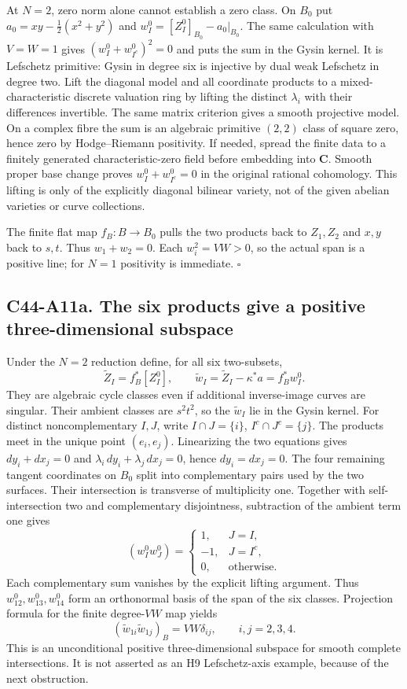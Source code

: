 \documentclass[11pt]{article}
\theoremstyle{remark}\newtheorem{remark}[theorem]{Remark}
\begin{document}
At $N=2$, zero norm alone cannot establish a zero class.
On $B_0$ put $a_0=xy-\tfrac12(x^2+y^2)$ and
$w_I^0=[Z_I^0]_{B_0}-a_0|_{B_0}$.
The same calculation with $V=W=1$ gives
$(w_I^0+w_{I^c}^0)^2=0$ and puts the sum in the Gysin kernel.
It is Lefschetz primitive: Gysin in degree six is injective
by dual weak Lefschetz in degree two.
Lift the diagonal model and all coordinate products to a
mixed-characteristic discrete valuation ring by lifting the
distinct $\lambda_i$ with their differences invertible.
The same matrix criterion gives a smooth projective model.
On a complex fibre the sum is an algebraic primitive $(2,2)$
class of square zero, hence zero by Hodge--Riemann positivity.
If needed, spread the finite data to a finitely generated
characteristic-zero field before embedding into $\mathbf C$.
Smooth proper base change proves
$w_I^0+w_{I^c}^0=0$ in the original rational cohomology.
This lifting is only of the explicitly diagonal bilinear
variety, not of the given abelian varieties or curve collections.

The finite flat map $f_B:B\to B_0$ pulls the two products back
to $Z_1,Z_2$ and $x,y$ back to $s,t$. Thus $w_1+w_2=0$.
Each $w_i^2=VW>0$, so the actual span is a positive line;
for $N=1$ positivity is immediate. \hfill$\square$

\subsection*{C44-A11a. The six products give a positive three-dimensional subspace}

Under the $N=2$ reduction define, for all six two-subsets,
\[
 \widetilde Z_I=f_B^*[Z_I^0],\qquad
 \widetilde w_I=\widetilde Z_I-\kappa^*a=f_B^*w_I^0.
\]
They are algebraic cycle classes even if additional inverse-image
curves are singular. Their ambient classes are $s^2t^2$, so the
$\widetilde w_I$ lie in the Gysin kernel.
For distinct noncomplementary $I,J$, write
$I\cap J=\{i\}$, $I^c\cap J^c=\{j\}$.
The products meet in the unique point $(e_i,e_j)$.
Linearizing the two equations gives
$dy_i+dx_j=0$ and $\lambda_i\,dy_i+\lambda_j\,dx_j=0$,
hence $dy_i=dx_j=0$.
The four remaining tangent coordinates on $B_0$ split into
complementary pairs used by the two surfaces. Their intersection
is transverse of multiplicity one. Together with self-intersection
two and complementary disjointness, subtraction of the ambient
term one gives
\[
 (w_I^0w_J^0)=
 \begin{cases}
 1,&J=I,\\
 -1,&J=I^c,\\
 0,&\text{otherwise}.
 \end{cases}                                                \tag{A11a.1}
\]
Each complementary sum vanishes by the explicit lifting argument.
Thus $w_{12}^0,w_{13}^0,w_{14}^0$ form an orthonormal basis of
the span of the six classes. Projection formula for the finite
degree-$VW$ map yields
\[
             (\widetilde w_{1i}\widetilde w_{1j})_B
                   =VW\delta_{ij},\qquad i,j=2,3,4.          \tag{A11a.2}
\]
This is an unconditional positive three-dimensional subspace for
smooth complete intersections. It is not asserted as an H9
Lefschetz-axis example, because of the next obstruction.
\end{document}
